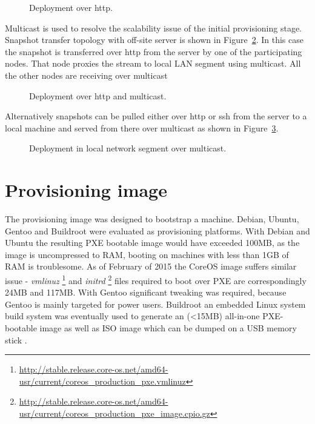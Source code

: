 \documentclass[a4paper,11pt]{kth-mag}
\begin{document}
\begin{figure}[!htb]
\centering
\scalebox{0.5}{}
\caption{Deployment over \acrshort{http}.}
\label{fig:butterknife-usecase-http}
\end{figure}

Multicast is used to resolve the scalability issue of
the initial provisioning stage.
Snapshot transfer topology with off-site
server is shown in Figure~\ref{fig:butterknife-usecase-tee}.
In this case the snapshot is transferred over \acrshort{http} from
the server by one of the participating nodes.
That node proxies the stream to local LAN segment using multicast.
All the other nodes are receiving over multicast

\begin{figure}[!htb]
\centering
\scalebox{0.5}{}
\caption{Deployment over \acrshort{http} and multicast.}
\label{fig:butterknife-usecase-tee}
\end{figure}

Alternatively snapshots can be pulled either over \acrshort{http} or \acrshort{ssh} from
the server to a local machine and served from there over multicast
as shown in Figure~\ref{fig:butterknife-usecase-multicast}.

\begin{figure}[!htb]
\centering
\scalebox{0.5}{}
\caption{Deployment in local network segment over multicast.}
\label{fig:butterknife-usecase-multicast}
\end{figure}



\section{Provisioning image}

The provisioning image was designed to bootstrap a machine.
Debian, Ubuntu, Gentoo and Buildroot were evaluated as
provisioning platforms.
With Debian and Ubuntu the resulting PXE bootable
image would have exceeded 100MB, as the image
is uncompressed to RAM, booting on machines with
less than 1GB of RAM is troublesome.
As of February of 2015 the CoreOS image suffers similar issue -
\emph{vmlinuz}
\footnote{\url{http://stable.release.core-os.net/amd64-usr/current/coreos_production_pxe.vmlinuz}}
and
\emph{initrd}
\footnote{\url{http://stable.release.core-os.net/amd64-usr/current/coreos_production_pxe_image.cpio.gz}}
files required to boot over PXE are correspondingly 24MB and 117MB.
With Gentoo significant tweaking was required, because Gentoo is
mainly targeted for power users.
Buildroot
an embedded Linux system build system
was eventually used to generate an (<15MB)
all-in-one PXE-bootable image as well as ISO image
which can be dumped on a USB memory stick \cite{tools-for-embedded-linux-dev}.
\end{document}
